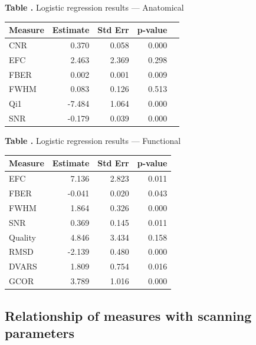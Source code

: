 \documentclass{frontiersSCNS} %
\begin{document}
\begin{table}
\textbf{\label{tab_log_reg_anat} Table .}{ Logistic regression results --- Anatomical }
  \begin{center}
    \begin{tabular}{ l r r r p{1.2cm} }
    \hline
    Measure  &Estimate & Std Err & p-value  \\ \hline
    CNR	&	0.370	&	0.058	&	0.000	\\
    EFC	&	2.463	&	2.369	&	0.298	\\
    FBER&	0.002	&	0.001	&	0.009	\\
    FWHM&	0.083	&	0.126	&	0.513	\\
    Qi1	&	-7.484	&	1.064	&	0.000	\\
    SNR	&	-0.179	&	0.039	&	0.000	\\
    \hline
    \end{tabular}

  \end{center}
\end{table}

\begin{table}
  \textbf{\label{tab_log_reg_func} Table .}{ Logistic regression results --- Functional }
  \begin{center}
    \begin{tabular}{ l r r r }
    \hline
    Measure &Estimate & Std Err & p-value  \\ \hline
    EFC	    &	7.136	&	2.823	&	0.011	\\
    FBER	&	-0.041  &	0.020	&	0.043	\\
    FWHM	&	1.864	&	0.326	&	0.000	\\
    SNR	    &	0.369	&	0.145	&	0.011	\\
    Quality	&	4.846	&	3.434	&	0.158	\\
    RMSD	&	-2.139  &	0.480	&	0.000	\\
    DVARS	&	1.809	&	0.754	&	0.016	   \\
    GCOR	&	3.789	&	1.016	&	0.000	\\
    \hline
    \end{tabular}
  \end{center}
\end{table}


\subsection{Relationship of measures with scanning parameters}
\end{document}
